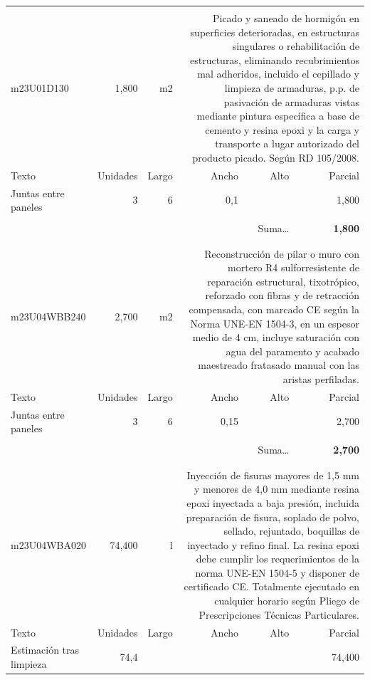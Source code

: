 \documentclass{book}%
\begin{document}
\begin{longtable}{lrrrrr}
&&&&&\\%
m23U01D130&     1,800& m2&\multicolumn{3}{p{6cm}}{\scriptsize Picado y saneado de hormigón en superficies deterioradas, en estructuras singulares o rehabilitación de estructuras, eliminando recubrimientos mal adheridos, incluido el cepillado y limpieza de armaduras, p.p. de pasivación de armaduras vistas mediante pintura específica a base de cemento y resina epoxi y la carga y transporte a lugar autorizado del producto picado. Según RD 105/2008.\normalsize}\\%
Texto&Unidades&Largo&Ancho&Alto&Parcial\\%
\hline%
\multicolumn{1}{p{3.5cm}}{Juntas entre paneles}&3&6&0,1&&     1,800\\%
&&&&&\\%
\multicolumn{5}{r}{Suma\ldots}&\textbf{     1,800}\\%
\hline%
&&&&&\\%
&&&&&\\%
m23U04WBB240&     2,700& m2&\multicolumn{3}{p{6cm}}{\scriptsize Reconstrucción de pilar o muro con mortero R4 sulforresistente de reparación estructural, tixotrópico, reforzado con fibras y de retracción compensada, con marcado CE según la Norma UNE-EN 1504-3, en un espesor medio de 4 cm, incluye saturación con agua del paramento y acabado maestreado fratasado manual con las aristas perfiladas.\normalsize}\\%
Texto&Unidades&Largo&Ancho&Alto&Parcial\\%
\hline%
\multicolumn{1}{p{3.5cm}}{Juntas entre paneles}&3&6&0,15&&     2,700\\%
&&&&&\\%
\multicolumn{5}{r}{Suma\ldots}&\textbf{     2,700}\\%
\hline%
&&&&&\\%
&&&&&\\%
m23U04WBA020&    74,400& l&\multicolumn{3}{p{6cm}}{\scriptsize Inyección de fisuras mayores de 1,5 mm y menores de 4,0 mm mediante resina epoxi inyectada a baja presión, incluida preparación de fisura, soplado de polvo, sellado, rejuntado, boquillas de inyectado y refino final. La resina epoxi debe cumplir los requerimientos de la norma UNE-EN 1504-5 y disponer de certificado CE. Totalmente ejecutado en cualquier horario según Pliego de Prescripciones Técnicas Particulares.\normalsize}\\%
Texto&Unidades&Largo&Ancho&Alto&Parcial\\%
\hline%
\multicolumn{1}{p{3.5cm}}{Estimación tras limpieza}&74,4&&&&    74,400\\%

\end{longtable}
\end{document}

